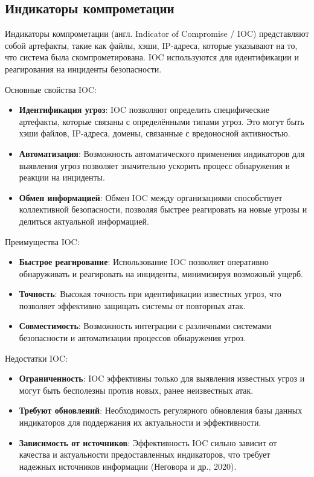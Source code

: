 \subsection{Индикаторы компрометации}

Индикаторы компрометации (англ. Indicator of Compromise / IOC) представляют собой артефакты, такие как файлы, хэши, IP-адреса, которые указывают на то, что система была скомпрометирована. IOC используются для идентификации и реагирования на инциденты безопасности.

Основные свойства IOC:
\begin{itemize}
    \item \textbf{Идентификация угроз}: IOC позволяют определить специфические артефакты, которые связаны с определёнными типами угроз. Это могут быть хэши файлов, IP-адреса, домены, связанные с вредоносной активностью.
    \item \textbf{Автоматизация}: Возможность автоматического применения индикаторов для выявления угроз позволяет значительно ускорить процесс обнаружения и реакции на инциденты.
    \item \textbf{Обмен информацией}: Обмен IOC между организациями способствует коллективной безопасности, позволяя быстрее реагировать на новые угрозы и делиться актуальной информацией.
\end{itemize}

Преимущества IOC:
\begin{itemize}
    \item \textbf{Быстрое реагирование}: Использование IOC позволяет оперативно обнаруживать и реагировать на инциденты, минимизируя возможный ущерб.
    \item \textbf{Точность}: Высокая точность при идентификации известных угроз, что позволяет эффективно защищать системы от повторных атак.
    \item \textbf{Совместимость}: Возможность интеграции с различными системами безопасности и автоматизации процессов обнаружения угроз.
\end{itemize}

Недостатки IOC:
\begin{itemize}
    \item \textbf{Ограниченность}: IOC эффективны только для выявления известных угроз и могут быть бесполезны против новых, ранее неизвестных атак.
    \item \textbf{Требуют обновлений}: Необходимость регулярного обновления базы данных индикаторов для поддержания их актуальности и эффективности.
    \item \textbf{Зависимость от источников}: Эффективность IOC сильно зависит от качества и актуальности предоставленных индикаторов, что требует надежных источников информации (Неговора и др., 2020).
\end{itemize}

